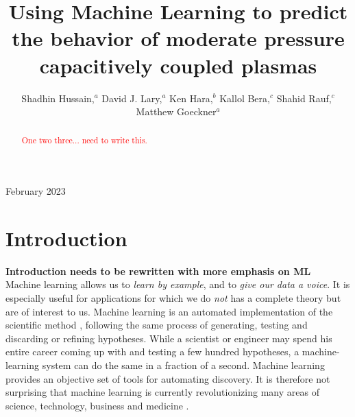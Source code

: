\documentclass[12pt]{iopart}
\begin{document}
\title{Using Machine Learning to predict the behavior of moderate pressure capacitively coupled plasmas}
\author{Shadhin Hussain,$^{ a}$ David J. Lary,$^{ a}$ Ken Hara,$^{b}$ Kallol Bera,$^{c}$ Shahid Rauf,$^{c}$  Matthew Goeckner$^a$}

\address{$^a$Department of Physics, University of Texas at Dallas, Richardson TX, 75080 \\
$^b$Aeronautics and Astronautics, Stanford University,  Stanford CA, 94305 \\
$^c$Applied Materials Corp, Santa Clara, CA 95054}
\vspace{10pt}
\begin{indented}
\item[]February 2023
\end{indented}

\begin{abstract}
\textcolor{red}{One two three... need to write this.}
\end{abstract}

%
%
%
% 
%



\section{Introduction}

\textbf{ Introduction needs to be rewritten with more emphasis on ML }\\

Machine learning allows us to \textit{learn by example}, and to \textit{give our data a voice}. It is especially useful for applications for which we do \textit{not} has a complete theory but are of interest to us. Machine learning is an automated implementation of the scientific method \cite{Domingos:2015}, following the same process of generating, testing and discarding or refining hypotheses. While a scientist or engineer may spend his entire career coming up with and testing a few hundred hypotheses, a machine-learning system can do the same in a fraction of a second. Machine learning provides an objective set of tools for automating discovery. It is therefore not surprising that machine learning is currently revolutionizing many areas of science, technology, business and medicine \cite{Lary:2016}.
\end{document}
